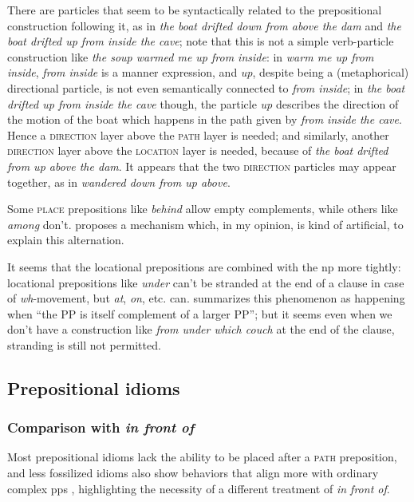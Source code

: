 \documentclass[UTF8, a4paper, oneside, scheme=plain, 12pt]{ctexbook}
\newcommand*{\citepage}[1]{p.~{#1}}
\newcommand{\form}[1]{\emph{#1}}
\newcommand{\category}[1]{\textsc{#1}}
\begin{document}
There are particles that 
seem to be syntactically related to the prepositional construction following it,
as in \form{the boat drifted down from above the dam}
and \form{the boat drifted up from inside the cave};
note that this is not a simple verb-particle construction 
like \form{the soup warmed me up from inside}:
in \form{warm me up from inside}, \form{from inside} is a manner expression,
and \form{up}, despite being a (metaphorical) directional particle, 
is not even semantically connected to \form{from inside};
in \form{the boat drifted up from inside the cave} though, 
the particle \form{up} describes the direction of the motion of the boat 
which happens in the path given by \form{from inside the cave}.
Hence a \category{direction} layer above the \category{path} layer is needed; 
and similarly, another \category{direction} layer above the \category{location} layer 
is needed, because of \form{the boat drifted from up above the dam}.
It appears that the two \category{direction} particles may appear together,
as in \form{wandered down from up above}.

Some \category{place} prepositions like \form{behind} allow empty complements,
while others like \form{among} don't.
\cite{spatialpp} proposes a mechanism which, in my opinion, is kind of artificial,
to explain this alternation.


It seems that the locational prepositions are combined with the \acs{np} more tightly:
locational prepositions like \form{under} can't be stranded at the end of a clause 
in case of \form{wh}-movement, 
but \form{at}, \form{on}, etc. can.
\citet[\citepage{630}]{cgel} summarizes this phenomenon as happening when
``the PP is itself complement of a larger PP''; 
but it seems even when we don't have a construction like \form{from under which couch}
at the end of the clause, 
stranding is still not permitted.

\subsection{Prepositional idioms}

\subsubsection{Comparison with \form{in front of}}\label{sec:np.pp.idiom.in-front-of}

Most prepositional idioms lack the ability 
to be placed after a \category{path} preposition,
and less fossilized idioms also show behaviors that align more with ordinary complex \acs{pp}s 
\citep[\citepage{620}]{cgel},
highlighting the necessity of a different treatment of \form{in front of}.
\end{document}
